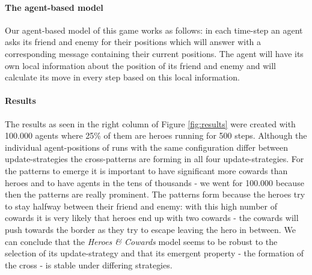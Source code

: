 \paragraph{The agent-based model}
Our agent-based model of this game works as follows: in each time-step an agent asks its friend and enemy for their positions which will answer with a corresponding message containing their current positions. The agent will have its own local information about the position of its friend and enemy and will calculate its move in every step based on this local information.

\paragraph{Results}
The results as seen in the right column of Figure \ref{fig:results} were created with 100.000 agents where 25\% of them are heroes running for 500 steps. Although the individual agent-positions of runs with the same configuration differ between update-strategies the cross-patterns are forming in all four update-strategies. For the patterns to emerge it is important to have significant more cowards than heroes and to have agents in the tens of thousands - we went for 100.000 because then the patterns are really prominent. The patterns form because the heroes try to stay halfway between their friend and enemy: with this high number of cowards it is very likely that heroes end up with two cowards - the cowards will push towards the border as they try to escape leaving the hero in between. We can conclude that the \textit{Heroes \& Cowards} model seems to be robust to the selection of its update-strategy and that its emergent property - the formation of the cross - is stable under differing strategies.